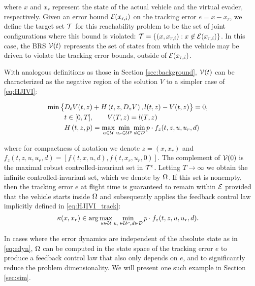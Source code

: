 where $x$ and $x_r$ represent the state of the actual vehicle and the virtual evader, respectively. Given an error bound $\mathcal{E}(x_{r,i})$ on the tracking error $e=x-x_r$, we define the target set $\mathcal{T}$ for this reachability problem to be the set of joint configurations where this bound is violated: $\mathcal{T} = \{(x, x_{r,i}): x\not\in\mathcal{E}(x_{r,i})\}$. In this case, the BRS $\mathcal{V}(t)$ represents the set of states from which the vehicle may be driven to violate the tracking error bounds, outside of $\mathcal{E}(x_{r,i})$.

With analogous definitions as those in Section \ref{sec:background}, $\mathcal{V}(t)$ can be characterized as the negative region of the solution $V$ to a simpler case of \eqref{eq:HJIVI}:

\begin{equation}
\label{eq:HJIVI_track}
\begin{aligned}
\min\big\{&D_t V(t, z) + H\left(t, z, D_z V\right), l(t,z) - V(t, z)\big\}= 0,\\
&t\in[0,T], \qquad V(T, z) = l(T, z) \\
&H\left(t, z, p\right) = \max_{u \in \mathcal{U}} \min_{u_r \in\mathcal{U}^p} \min_{d \in \mathcal{D}} p \cdot f_z(t,z,u,u_r,d)
\end{aligned}
\end{equation}

\noindent where for compactness of notation we denote $z=(x,x_r)$ and $f_z(t,z,u,u_r,d) = [f(t,x,u,d),f(t,x_r,u_r,0)]$. The complement of $\mathcal{V}(0)$ is the maximal robust controlled-invariant set in $\mathcal{T}^\text{c}$. Letting $T\to\infty$ we obtain the infinite controlled-invariant set, which we denote by $\Omega$. If this set is nonempty, then the tracking error $e$ at flight time is guaranteed to remain within $\mathcal{E}$ provided that the vehicle starts inside $\Omega$ and subsequently applies the feedback control law implicitly defined in \eqref{eq:HJIVI_track}:
\begin{equation}\label{eq:robust_tracking_law}
\kappa(x,x_r) \in \arg\max_{u \in \mathcal{U}} \min_{u_r \in\mathcal{U}^p, d \in \mathcal{D}} p \cdot f_z(t,z,u,u_r,d).
\end{equation}

In cases where the error dynamics are independent of the absolute state as in \eqref{eq:edyn}, $\Omega$ can be computed in the state space of the tracking error $e$ to produce a feedback control law that also only depends on $e$, and to significantly reduce the problem dimensionality. We will present one such example in Section \ref{sec:sim}.

